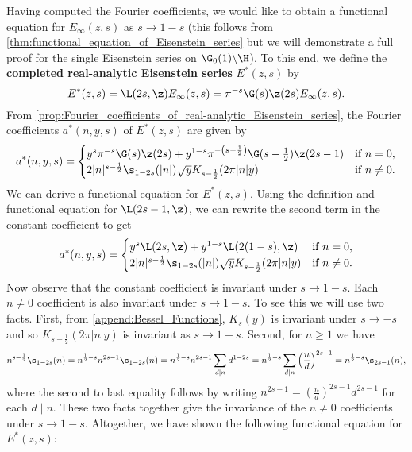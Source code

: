       Having computed the Fourier coefficients, we would like to obtain a functional equation for $E_{\infty}(z,s)$ as $s \to 1-s$ (this follows from \cref{thm:functional_equation_of_Eisenstein_series} but we will demonstrate a full proof for the single Eisenstein series on $\G_{0}(1)\backslash\H$). To this end, we define the \textbf{completed real-analytic Eisenstein series} $E^{\ast}(z,s)$ by
      \[
        E^{\ast}(z,s) = \L(2s,\z)E_{\infty}(z,s) = \pi^{-s}\G(s)\z(2s)E_{\infty}(z,s).
      \]
      From \cref{prop:Fourier_coefficients_of_real-analytic_Eisenstein_series}, the Fourier coefficients $a^{\ast}(n,y,s)$ of $E^{\ast}(z,s)$ are given by
      \[
        a^{\ast}(n,y,s) = \begin{cases} y^{s}\pi^{-s}\G(s)\z(2s)+y^{1-s}\pi^{-\left(s-\frac{1}{2}\right)}\G(s-\frac{1}{2})\z(2s-1) & \text{if $n = 0$}, \\ 2|n|^{s-\frac{1}{2}}\s_{1-2s}(|n|)\sqrt{y}K_{s-\frac{1}{2}}(2\pi|n|y) & \text{if $n \neq 0$}. \end{cases}
      \]
      We can derive a functional equation for $E^{\ast}(z,s)$. Using the definition and functional equation for $\L(2s-1,\z)$, we can rewrite the second term in the constant coefficient to get
      \begin{equation}\label{equ:Fourier_coefficients_for_completed_real-analytic_Eisenstein_series}
        a^{\ast}(n,y,s) = \begin{cases} y^{s}\L(2s,\z)+y^{1-s}\L(2(1-s),\z) & \text{if $n = 0$}, \\ 2|n|^{s-\frac{1}{2}}\s_{1-2s}(|n|)\sqrt{y}K_{s-\frac{1}{2}}(2\pi|n|y) & \text{if $n \neq 0$}. \end{cases}
      \end{equation}
      Now observe that the constant coefficient is invariant under $s \to 1-s$. Each $n \neq 0$ coefficient is also invariant under $s \to 1-s$. To see this we will use two facts. First, from \cref{append:Bessel_Functions}, $K_{s}(y)$ is invariant under $s \to -s$ and so $K_{s-\frac{1}{2}}(2\pi|n|y)$ is invariant as $s \to 1-s$. Second, for $n \ge 1$ we have
      \[
        n^{s-\frac{1}{2}}\s_{1-2s}(n) = n^{\frac{1}{2}-s}n^{2s-1}\s_{1-2s}(n) = n^{\frac{1}{2}-s}n^{2s-1}\sum_{d \mid n}d^{1-2s} = n^{\frac{1}{2}-s}\sum_{d \mid n}\left(\frac{n}{d}\right)^{2s-1} = n^{\frac{1}{2}-s}\s_{2s-1}(n),
      \]
      where the second to last equality follows by writing $n^{2s-1} = \left(\frac{n}{d}\right)^{2s-1}d^{2s-1}$ for each $d \mid n$. These two facts together give the invariance of the $n \neq 0$ coefficients under $s \to 1-s$. Altogether, we have shown the following functional equation for $E^{\ast}(z,s)$:
